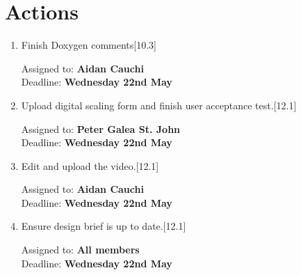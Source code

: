\documentclass[11pt,a4paper]{article}
\begin{document}
\section*{Actions}

\begin{enumerate}

\item Finish Doxygen comments[10.3]
\begin{flushright}
	Assigned to: \textbf{Aidan Cauchi} \\
	Deadline: \textbf{Wednesday 22nd May}
\end{flushright}

\item Upload digital scaling form and finish user acceptance test.[12.1]
\begin{flushright}
	Assigned to: \textbf{Peter Galea St. John} \\
	Deadline: \textbf{Wednesday 22nd May}
\end{flushright}

\item Edit and upload the video.[12.1]
\begin{flushright}
	Assigned to: \textbf{Aidan Cauchi} \\
	Deadline: \textbf{Wednesday 22nd May}
\end{flushright}

\item Ensure design brief is up to date.[12.1]
\begin{flushright}
	Assigned to: \textbf{All members} \\
	Deadline: \textbf{Wednesday 22nd May}
\end{flushright}

\end{enumerate}	
\end{document}
